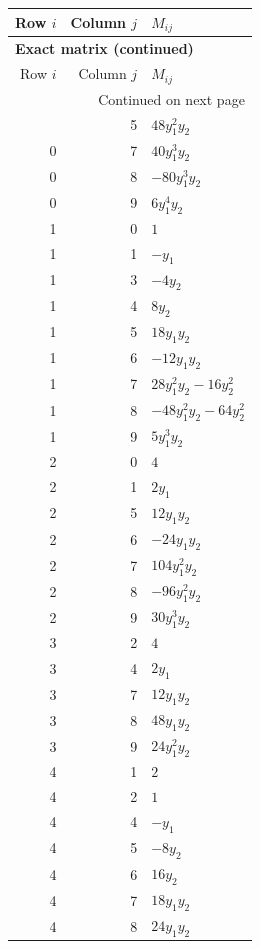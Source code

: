 \documentclass[10pt,a4paper]{article}
\begin{document}
{\small\setlength{\tabcolsep}{7pt}\begin{longtable}{rrp{125mm}}
\toprule Row $i$ & Column $j$ & $M_{ij}$\\\midrule\endfirsthead
\multicolumn{3}{l}{\textbf{Exact matrix (continued)}}\\
\toprule Row $i$ & Column $j$ & $M_{ij}$\\\midrule\endhead
\midrule\multicolumn{3}{r}{Continued on next page}\\\endfoot\bottomrule\endlastfoot
0 & 5 & $48 y_{1}^{2} y_{2}$\\
0 & 7 & $40 y_{1}^{3} y_{2}$\\
0 & 8 & $- 80 y_{1}^{3} y_{2}$\\
0 & 9 & $6 y_{1}^{4} y_{2}$\\
1 & 0 & $1$\\
1 & 1 & $- y_{1}$\\
1 & 3 & $- 4 y_{2}$\\
1 & 4 & $8 y_{2}$\\
1 & 5 & $18 y_{1} y_{2}$\\
1 & 6 & $- 12 y_{1} y_{2}$\\
1 & 7 & $28 y_{1}^{2} y_{2} - 16 y_{2}^{2}$\\
1 & 8 & $- 48 y_{1}^{2} y_{2} - 64 y_{2}^{2}$\\
1 & 9 & $5 y_{1}^{3} y_{2}$\\
2 & 0 & $4$\\
2 & 1 & $2 y_{1}$\\
2 & 5 & $12 y_{1} y_{2}$\\
2 & 6 & $- 24 y_{1} y_{2}$\\
2 & 7 & $104 y_{1}^{2} y_{2}$\\
2 & 8 & $- 96 y_{1}^{2} y_{2}$\\
2 & 9 & $30 y_{1}^{3} y_{2}$\\
3 & 2 & $4$\\
3 & 4 & $2 y_{1}$\\
3 & 7 & $12 y_{1} y_{2}$\\
3 & 8 & $48 y_{1} y_{2}$\\
3 & 9 & $24 y_{1}^{2} y_{2}$\\
4 & 1 & $2$\\
4 & 2 & $1$\\
4 & 4 & $- y_{1}$\\
4 & 5 & $- 8 y_{2}$\\
4 & 6 & $16 y_{2}$\\
4 & 7 & $18 y_{1} y_{2}$\\
4 & 8 & $24 y_{1} y_{2}$\\

\end{longtable}}
\end{document}
